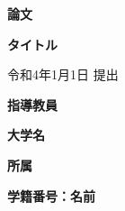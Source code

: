 \begin{titlepage}
  \begin{center}

    {\Large \textbf{論文}}

    \vspace*{180truept}

    {\huge \textbf{タイトル}}

    \vspace{100truept}

    {令和4年1月1日 提出}

    \vspace{40truept}

    {\Large \textbf{指導教員}}

    \vspace{70truept}

    {\Large \textbf{大学名}}

    \vspace{10truept}

    {\Large \textbf{所属}}

    \vspace{10truept}

    {\Large \textbf{学籍番号：名前}}
  \end{center}
\end{titlepage}
